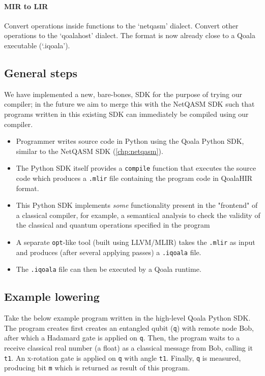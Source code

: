 \paragraph{MIR to LIR}
Convert operations inside functions to the `netqasm' dialect.
Convert other operations to the `qoalahost' dialect.
The format is now already close to a Qoala executable (`.iqoala').

\subsection{General steps}
We have implemented a new, bare-bones, SDK for the purpose of trying our compiler; in the future we aim to merge this with the NetQASM SDK such that programs written in this existing SDK can immediately be compiled using our compiler.

\begin{itemize}
\item Programmer writes source code in Python using the Qoala Python SDK, similar to the NetQASM SDK (\cref{chp:netqasm}).
\item The Python SDK itself provides a \texttt{compile} function that executes the source code
  which produces a \texttt{.mlir} file containing the program code in QoalaHIR format.
\item This Python SDK implements \textit{some} functionality present in the "frontend" of a classical
  compiler, for example, a semantical analysis to check the validity of the classical and
  quantum operations specified in the program 
\item A separate \texttt{opt}-like tool (built using LLVM/MLIR) takes the \texttt{.mlir} as input and produces
  (after several applying passes) a \texttt{.iqoala} file.
\item The \texttt{.iqoala} file can then be executed by a Qoala runtime.
\end{itemize}


\subsection{Example lowering}

Take the below example program written in the high-level Qoala Python SDK.
The program creates first creates an entangled qubit (\texttt{q}) with remote node Bob, after which a Hadamard gate is applied on \texttt{q}.
Then, the program waits to a receive classical real number (a float) as a classical message from Bob, calling it \texttt{t1}.
An x-rotation gate is applied on \texttt{q} with angle \texttt{t1}.
Finally, \texttt{q} is measured, producing bit \texttt{m} which is returned as result of this program.

